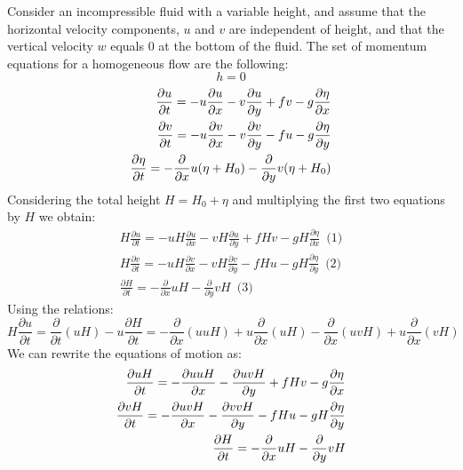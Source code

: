 Consider an incompressible fluid with a variable height, and assume that the horizontal velocity components, $u$ and $v$ are independent of height, and that the vertical velocity $w$ equals 0 at the bottom of the fluid. The set of momentum equations for a homogeneous flow are the following:
$$h=0$$
\begin{align}\label{eq.momentum}
    \frac{\partial u}{\partial t}=-u\frac{\partial u}{\partial x}-v\frac{\partial u}{\partial y}+fv-g\frac{\partial\eta}{\partial x}\\
    \frac{\partial v}{\partial t}=-u\frac{\partial v}{\partial x}-v\frac{\partial v}{\partial y}-fu-g\frac{\partial\eta}{\partial y}\notag\\
    \frac{\partial \eta}{\partial t}=-\frac{\partial}{\partial x}u(\eta+H_0)-\frac{\partial }{\partial y}v(\eta+H_0)\notag
\end{align}
Considering the total height $H=H_0+\eta$ and multiplying the first two equations by $H$ we obtain:
\begin{align*}
   H \frac{\partial u}{\partial t}=-uH\frac{\partial u}{\partial x}-vH\frac{\partial u}{\partial y}+fHv-gH\frac{\partial\eta}{\partial x} \,\,\, \text{(1)}\\
    H\frac{\partial v}{\partial t}=-uH\frac{\partial v}{\partial x}-vH\frac{\partial v}{\partial y}-fHu-gH\frac{\partial\eta}{\partial y}\,\,\, \text{(2)} \\
    \frac{\partial H}{\partial t}=-\frac{\partial}{\partial x}uH-\frac{\partial }{\partial y}vH \,\,\, \text{(3)}
\end{align*}
Using the relations:
\begin{equation}
    H\frac{\partial u}{\partial t}=\frac{\partial}{\partial t}(uH)-u\frac{\partial H}{\partial t}=-\frac{\partial}{\partial x}(uuH)+u\frac{\partial}{\partial x}(uH)-\frac{\partial}{\partial x}(uvH)+u\frac{\partial}{\partial x}(vH)
\end{equation}
We can rewrite the equations of motion as:
\begin{align}
    \frac{\partial uH}{\partial t}=-\frac{\partial uuH}{\partial x}-\frac{\partial uvH}{\partial y}+fHv-g\frac{\partial\eta}{\partial x}\\
    \frac{\partial vH}{\partial t}=-\frac{\partial uvH}{\partial x}-\frac{\partial vvH}{\partial y}-fHu-gH\frac{\partial\eta}{\partial y}\notag\\
    \frac{\partial H}{\partial t}=-\frac{\partial}{\partial x}uH-\frac{\partial }{\partial y}vH\notag
\end{align}
